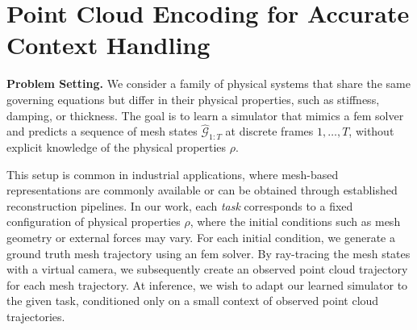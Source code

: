\section{Point Cloud Encoding for Accurate Context Handling}
\label{sec:method}

\textbf{Problem Setting.}
We consider a family of physical systems that share the same governing equations but differ in their physical properties, such as stiffness, damping, or thickness.
The goal is to learn a simulator that mimics a \gls{fem} solver and predicts a sequence of mesh states $\hat{\mathcal{G}}_{1:T}$ at discrete frames $1,\ldots,T$, without explicit knowledge of the physical properties $\rho$.

This setup is common in industrial applications, where mesh-based representations are commonly available or can be obtained through established reconstruction pipelines.
In our work, each \emph{task} corresponds to a fixed configuration of physical properties $\rho$, where the initial conditions such as mesh geometry or external forces may vary.
For each initial condition, we generate a ground truth mesh trajectory using an \gls{fem} solver.
By ray-tracing the mesh states with a virtual camera, we subsequently create an observed point cloud trajectory for each mesh trajectory.
At inference, we wish to adapt our learned simulator to the given task, conditioned only on a small context of observed point cloud trajectories.

